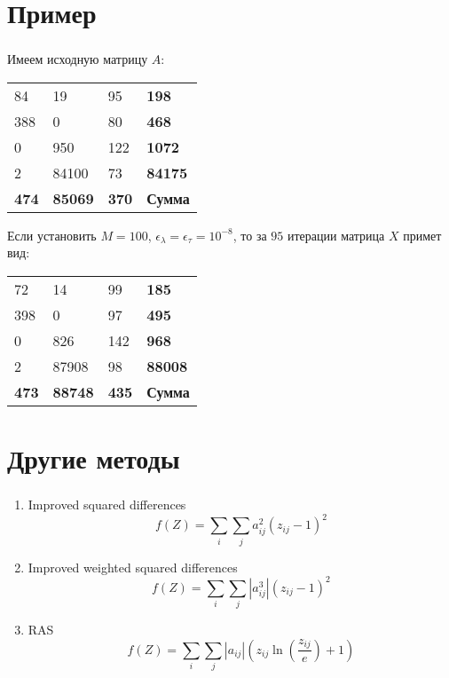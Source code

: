 \documentclass{beamer}
\begin{document}
\section{Пример}
\begin{frame}
	\frametitle{\insertsection}
	
	Имеем исходную матрицу $A$:
	
	\begin{center}
		\begin{tabular}{|m{2cm}|m{2cm}|m{2cm}||m{2cm}|}
			\hline
			84 & 19 & 95 & \textbf{198} \\
			388 & 0 & 80 & \textbf{468} \\
			0 & 950 & 122 & \textbf{1072} \\
			2 & 84100 & 73 & \textbf{84175} \\
			\hline
			\hline
			\textbf{474} & \textbf{85069} & \textbf{370} & \textbf{Сумма} \\
			\hline
		\end{tabular}
	\end{center}
	
	Если установить $M = 100$, $\epsilon_\lambda = \epsilon_\tau = 10^{-8}$, то за $95$ итерации матрица $X$ примет вид:
	
	\begin{center}
		\begin{tabular}{|m{2cm}|m{2cm}|m{2cm}||m{2cm}|}
			\hline
			72 & 14 & 99 & \textbf{185} \\
			398 & 0 & 97 & \textbf{495} \\
			0 & 826 & 142 & \textbf{968} \\
			2 & 87908 & 98 & \textbf{88008} \\
			\hline
			\hline
			\textbf{473} & \textbf{88748} & \textbf{435} & \textbf{Сумма} \\
			\hline
		\end{tabular}
	\end{center}
	
\end{frame}

\section{Другие методы}
\begin{frame}
	\frametitle{\insertsection}
	
	\begin{enumerate}
	    \item Improved squared differences
	    $$f(Z) = \sum_i \sum_j a_{ij}^2(z_{ij}-1)^2$$
	    \item Improved weighted squared differences
	    $$f(Z) = \sum_i \sum_j |a_{ij}^3|(z_{ij}-1)^2$$
	    \item RAS
	    $$f(Z) = \sum_i \sum_j |a_{ij}| \left(z_{ij} \ln \left( \frac{z_{ij}}{e} \right) + 1 \right)$$
	\end{enumerate}
	
\end{frame}
\end{document}
